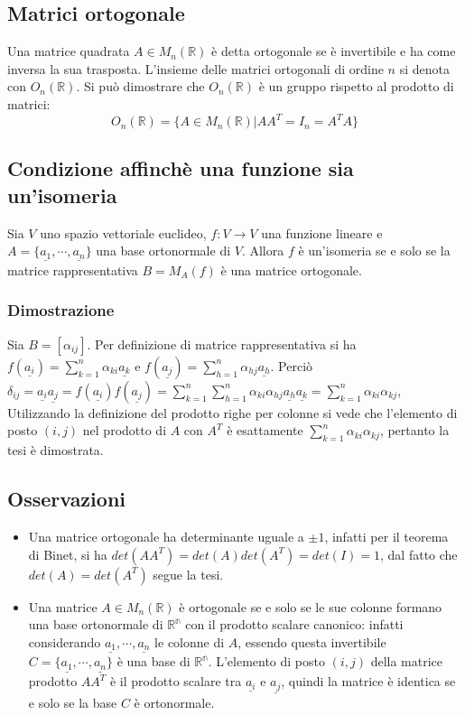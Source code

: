 \subsection{Matrici ortogonale}
Una matrice quadrata $A\in M_n(\mathbb{R})$ \`e detta ortogonale se \`e invertibile e ha come inversa la sua trasposta. L'insieme delle matrici ortogonali di ordine $n$ si denota
con $O_n(\mathbb{R})$. Si pu\`o dimostrare che $O_n(\mathbb{R})$ \`e un gruppo rispetto al prodotto di matrici:
\begin{equation}
O_n(\mathbb{R})=\{A\in M_n(\mathbb{R})|AA^T=I_n=A^TA\}
\end{equation}
\subsection{Condizione affinch\`e una funzione sia un'isomeria}
Sia $V$ uno spazio vettoriale euclideo, $f:V\rightarrow V$ una funzione lineare e $A=\{\underline{a_1},\cdots,\underline{a_n}\}$ una base ortonormale di $V$. Allora $f$ \`e 
un'isomeria se e solo se la matrice rappresentativa $B=M_A(f)$ \`e una matrice ortogonale.
\subsubsection{Dimostrazione}
Sia $B=[\alpha_{ij}]$. Per definizione di matrice rappresentativa si ha $f(\underline{a_i})=\sum\limits_{k=1}^n\alpha_{ki}\underline{a_k}$ e $f(\underline{a_j})=\sum\limits_{h=1}
^n\alpha_{hj}\underline{a_h}$. Perci\`o $\delta_{ij}=\underline{a_i}\underline{a_j}=f(\underline{a_i})f(\underline{a_j})=\sum\limits_{k=1}^n\sum\limits_{h=1}^n\alpha_{ki}
\alpha_{hj}\underline{a_h}\underline{a_k}=\sum\limits_{k=1}^n\alpha_{ki}\alpha_{kj}$, Utilizzando la definizione del prodotto righe per colonne si vede che l'elemento di posto
$(i,j)$ nel prodotto di $A$ con $A^T$ \`e esattamente $\sum\limits_{k=1}^n\alpha_{ki}\alpha_{kj}$, pertanto la tesi \`e dimostrata.
\subsection{Osservazioni}
\begin{itemize}
\item Una matrice ortogonale ha determinante uguale a $\pm 1$, infatti per il teorema di Binet, si ha $det(AA^T)=det(A)det(A^T)=det(I)=1$, dal fatto che $det(A)=det(A^T)$ segue 
la tesi.
\item Una matrice $A\in M_n(\mathbb{R})$ \`e ortogonale se e solo se le sue colonne formano una base ortonormale di $\mathbb{R^n}$ con il prodotto scalare canonico: infatti 
considerando $\underline{a_1},\cdots,\underline{a_n}$ le colonne di $A$, essendo questa invertibile $C=\{\underline{a_1},\cdots,\underline{a_n}\}$ \`e una base di $\mathbb{R^n}$. 
L'elemento di posto $(i,j)$ della matrice prodotto $AA^T$ \`e il prodotto scalare tra $\underline{a_i}$ e $\underline{a_j}$, quindi la matrice \`e identica se e solo se la base 
$C$ \`e ortonormale.
\end{itemize}